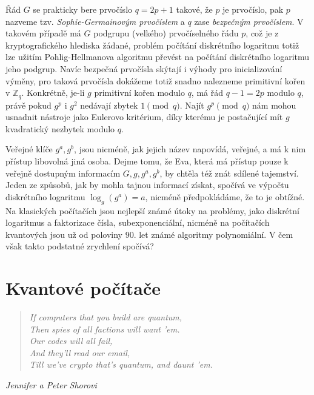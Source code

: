 \documentclass[12pt]{report}
\begin{document}
Řád $G$ se prakticky bere prvočíslo $q = 2p+1$ takové, že $p$ je prvočíslo, pak $p$ nazveme tzv. \textit{Sophie-Germainovým prvočíslem} a $q$ zase \textit{bezpečným prvočíslem}. V takovém případě má $G$ podgrupu (velkého) prvočíselného řádu $p$, což je z kryptografického hlediska žádané, problém počítání diskrétního logaritmu totiž lze užitím Pohlig-Hellmanova algoritmu převést na počítání diskrétního logaritmu jeho podgrup. Navíc bezpečná prvočísla skýtají i výhody pro inicializování výměny, pro taková prvočísla dokážeme totiž snadno nalezneme primitivní kořen v $\mathbb{Z}_q$. Konkrétně, je-li $g$ primitivní kořen modulo $q$, má řád $q-1 = 2p$ modulo $q$, právě pokud $g^{p}$ i $g^2$ nedávají zbytek $1 \pmod{q}$. Najít $g^{p} \pmod{q}$ nám mohou usnadnit nástroje jako Eulerovo kritérium, díky kterému je postačující mít $g$ kvadratický nezbytek modulo $q$.

Veřejné klíče $g^a,g^b$, jsou nicméně, jak jejich název napovídá, veřejné, a má k nim přístup libovolná jiná osoba. Dejme tomu, že Eva, která má přístup pouze k veřejně dostupným informacím $G,g,g^a,g^b$, by chtěla též znát sdílené tajemství. Jeden ze způsobů, jak by mohla tajnou informací získat, spočívá ve výpočtu diskrétního logaritmu $\log_g(g^a) = a$, nicméně předpokládáme, že to je obtížné. Na klasických počítačích jsou nejlepší známé útoky na problémy, jako diskrétní logaritmus a faktorizace čísla, subexponenciální, nicméně na počítačích kvantových jsou už od poloviny $90$. let známé algoritmy polynomiální. V čem však takto podstatné zrychlení spočívá?


\section{Kvantové počítače}

\begin{center}
\begin{verse}
\qquad \textit{If computers that you build are quantum,}\\
\qquad \textit{Then spies of all factions will want 'em.}\\
\qquad \textit{Our codes will all fail,}\\
\qquad \textit{And they'll read our email,}\\
\qquad \textit{Till we've crypto that's quantum, and daunt 'em. }
\end{verse}
\hfill \textit{Jennifer a Peter Shorovi}
\end{center}
\end{document}
